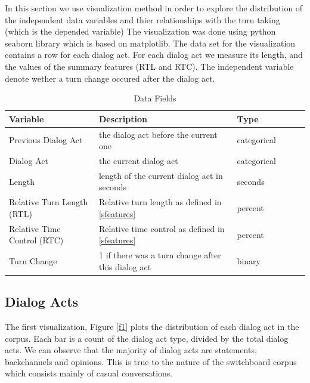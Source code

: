 In this section we use visualization method in order to explore the distribution of the independent data variables and thier relationships with the turn taking (which is the depended variable)
%
The visualization was done using python seaborn library which is based on matplotlib. The data set for the visualization contains a row for each dialog act. For each dialog act we measure its length, and the values of the summary features (RTL and RTC). The independent variable denote wether a turn change occured after the dialog act.

\begin{table}[ht!]
\begin{center}
\begin{tabular}{llllrr}
\toprule
Variable &  Description & Type &\\
\midrule
     Previous Dialog Act & the dialog act before the current one  & categorical\\
     Dialog Act & the current dialog act & categorical \\
     Length & length of the current dialog act in seconds & seconds \\
     Relative Turn Length (RTL)  & Relative turn length as defined in \ref{sfeatures} & percent \\
     Relative Time Control (RTC) & Relative time control as defined in \ref{sfeatures} & percent \\
     Turn Change & 1 if there was a turn change after this dialog act & binary \\
\bottomrule
\end{tabular}
\end{center}
\caption{Data Fields}
\end{table}


\subsection{Dialog Acts}

The first visualization, Figure \ref{f1} plots the distribution of each dialog act in the corpus. Each bar is a count of the dialog act type, divided by the total dialog acts.  We can observe that the majority of dialog acts are statements, backchannels and opinions. This is true to the nature of the switchboard corpus which consists mainly of casual conversations.

